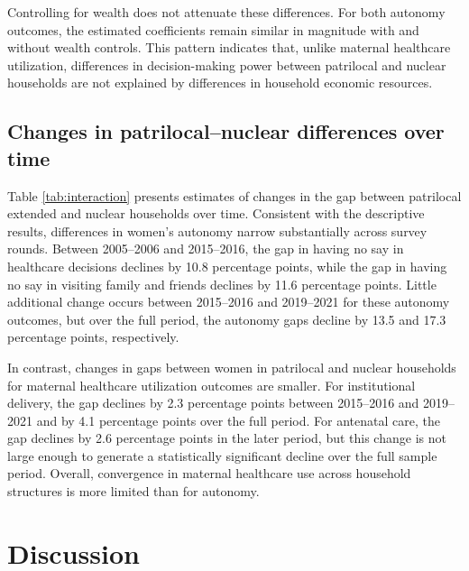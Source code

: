\documentclass[12pt]{article}
\begin{document}
Controlling for wealth does not attenuate these differences. For both autonomy outcomes, the estimated coefficients remain similar in magnitude with and without wealth controls. This pattern indicates that, unlike maternal healthcare utilization, differences in decision-making power between patrilocal and nuclear households are not explained by differences in household economic resources.

\subsection{Changes in patrilocal–nuclear differences over time}

Table \ref{tab:interaction} presents estimates of changes in the gap between patrilocal extended and nuclear households over time. Consistent with the descriptive results, differences in women’s autonomy narrow substantially across survey rounds. Between 2005–2006 and 2015–2016, the gap in having no say in healthcare decisions declines by 10.8 percentage points, while the gap in having no say in visiting family and friends declines by 11.6 percentage points. Little additional change occurs between 2015–2016 and 2019–2021 for these autonomy outcomes, but over the full period, the autonomy gaps decline by 13.5 and 17.3 percentage points, respectively.

In contrast, changes in gaps between women in patrilocal and nuclear households for maternal healthcare utilization outcomes are smaller. For institutional delivery, the gap declines by 2.3 percentage points between 2015–2016 and 2019–2021 and by 4.1 percentage points over the full period. For antenatal care, the gap declines by 2.6 percentage points in the later period, but this change is not large enough to generate a statistically significant decline over the full sample period. Overall, convergence in maternal healthcare use across household structures is more limited than for autonomy.
 
\section{Discussion}
\end{document}
